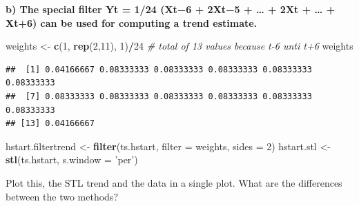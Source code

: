 \documentclass[
]{article}
\newenvironment{Shaded}{\begin{snugshade}}{\end{snugshade}}
\newcommand{\CommentTok}[1]{\textcolor[rgb]{0.56,0.35,0.01}{\textit{#1}}}
\newcommand{\DataTypeTok}[1]{\textcolor[rgb]{0.13,0.29,0.53}{#1}}
\newcommand{\DecValTok}[1]{\textcolor[rgb]{0.00,0.00,0.81}{#1}}
\newcommand{\FloatTok}[1]{\textcolor[rgb]{0.00,0.00,0.81}{#1}}
\newcommand{\KeywordTok}[1]{\textcolor[rgb]{0.13,0.29,0.53}{\textbf{#1}}}
\newcommand{\NormalTok}[1]{#1}
\newcommand{\OperatorTok}[1]{\textcolor[rgb]{0.81,0.36,0.00}{\textbf{#1}}}
\newcommand{\StringTok}[1]{\textcolor[rgb]{0.31,0.60,0.02}{#1}}
\begin{document}
\textbf{b) The special filter Yt = 1/24 (Xt−6 + 2Xt−5 + \ldots{} + 2Xt +
\ldots{} + Xt+6) can be used for computing a trend estimate.}

\begin{Shaded}
\begin{Highlighting}[]
\NormalTok{weights <-}\StringTok{ }\KeywordTok{c}\NormalTok{(}\DecValTok{1}\NormalTok{, }\KeywordTok{rep}\NormalTok{(}\DecValTok{2}\NormalTok{,}\DecValTok{11}\NormalTok{), }\DecValTok{1}\NormalTok{)}\OperatorTok{/}\DecValTok{24} \CommentTok{# total of 13 values because t-6 unti t+6}
\NormalTok{weights}
\end{Highlighting}
\end{Shaded}

\begin{verbatim}
##  [1] 0.04166667 0.08333333 0.08333333 0.08333333 0.08333333 0.08333333
##  [7] 0.08333333 0.08333333 0.08333333 0.08333333 0.08333333 0.08333333
## [13] 0.04166667
\end{verbatim}

\begin{Shaded}
\begin{Highlighting}[]
\NormalTok{hstart.filtertrend <-}\StringTok{ }\KeywordTok{filter}\NormalTok{(ts.hstart, }\DataTypeTok{filter =}\NormalTok{ weights, }\DataTypeTok{sides =} \DecValTok{2}\NormalTok{)}
\NormalTok{hstart.stl <-}\StringTok{ }\KeywordTok{stl}\NormalTok{(ts.hstart, }\DataTypeTok{s.window =} \StringTok{'per'}\NormalTok{)}
\end{Highlighting}
\end{Shaded}

Plot this, the STL trend and the data in a single plot. What are the
differences between the two methods?

\begin{Shaded}
\end{Shaded}
\end{document}
